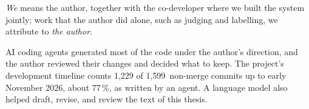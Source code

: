 \emph{We} means the author, together with the co-developer where we built the
system jointly; work that the author did alone, such as judging and
labelling, we attribute to \emph{the author}.

AI coding agents generated most of the code under the author's direction, and
the author reviewed their changes and decided what to keep. The project's
development timeline counts 1{,}229 of 1{,}599~non-merge commits up to early
November 2026, about 77\,\%, as written by an agent. A language model also
helped draft, revise, and review the text of this thesis.
